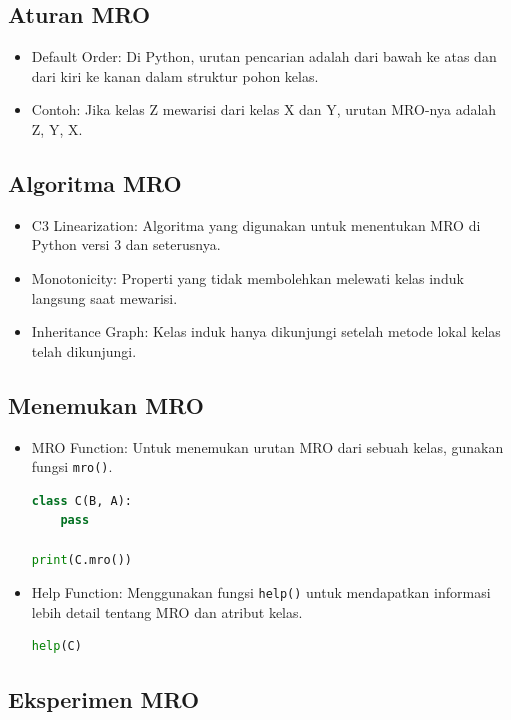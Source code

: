 \documentclass{article}
\begin{document}
\subsection{Aturan MRO}
\begin{itemize}
    \item Default Order: Di Python, urutan pencarian adalah dari bawah ke atas dan dari kiri ke kanan dalam struktur pohon kelas.
    \item Contoh: Jika kelas Z mewarisi dari kelas X dan Y, urutan MRO-nya adalah Z, Y, X.
\end{itemize}

\subsection{Algoritma MRO}
\begin{itemize}
    \item C3 Linearization: Algoritma yang digunakan untuk menentukan MRO di Python versi 3 dan seterusnya.
    \item Monotonicity: Properti yang tidak membolehkan melewati kelas induk langsung saat mewarisi.
    \item Inheritance Graph: Kelas induk hanya dikunjungi setelah metode lokal kelas telah dikunjungi.
\end{itemize}

\subsection{Menemukan MRO}
\begin{itemize}
    \item MRO Function: Untuk menemukan urutan MRO dari sebuah kelas, gunakan fungsi \verb|mro()|.
          \begin{lstlisting}[language=Python, caption={}, captionpos=b]
class C(B, A):
    pass

print(C.mro())
\end{lstlisting}
    \item Help Function: Menggunakan fungsi \verb|help()| untuk mendapatkan informasi lebih detail tentang MRO dan atribut kelas.
          \begin{lstlisting}[language=Python, caption={}, captionpos=b]
help(C)
\end{lstlisting}
\end{itemize}

\subsection{Eksperimen MRO}
\end{document}
